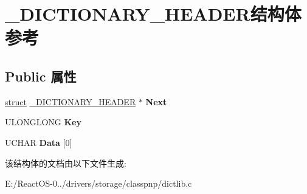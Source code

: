 \hypertarget{struct___d_i_c_t_i_o_n_a_r_y___h_e_a_d_e_r}{}\section{\+\_\+\+D\+I\+C\+T\+I\+O\+N\+A\+R\+Y\+\_\+\+H\+E\+A\+D\+E\+R结构体 参考}
\label{struct___d_i_c_t_i_o_n_a_r_y___h_e_a_d_e_r}
\subsection*{Public 属性}
\begin{DoxyCompactItemize}
\item 
\mbox{\label{struct___d_i_c_t_i_o_n_a_r_y___h_e_a_d_e_r_a749bdd1e64b881ea95e91b5a51aa5d27}} 
\hyperlink{interfacestruct}{struct} \hyperlink{struct___d_i_c_t_i_o_n_a_r_y___h_e_a_d_e_r}{\+\_\+\+D\+I\+C\+T\+I\+O\+N\+A\+R\+Y\+\_\+\+H\+E\+A\+D\+ER} $\ast$ {\bfseries Next}
\item 
\mbox{\label{struct___d_i_c_t_i_o_n_a_r_y___h_e_a_d_e_r_a68e108dbd3d0ce5cca6c272440d1f2e3}} 
U\+L\+O\+N\+G\+L\+O\+NG {\bfseries Key}
\item 
\mbox{\label{struct___d_i_c_t_i_o_n_a_r_y___h_e_a_d_e_r_a80c359f8eea3e8dcc17100da8a9f8cd9}} 
U\+C\+H\+AR {\bfseries Data} \mbox{[}0\mbox{]}
\end{DoxyCompactItemize}


该结构体的文档由以下文件生成\+:\begin{DoxyCompactItemize}
\item 
E\+:/\+React\+O\+S-\/0../drivers/storage/classpnp/dictlib.\+c\end{DoxyCompactItemize}
